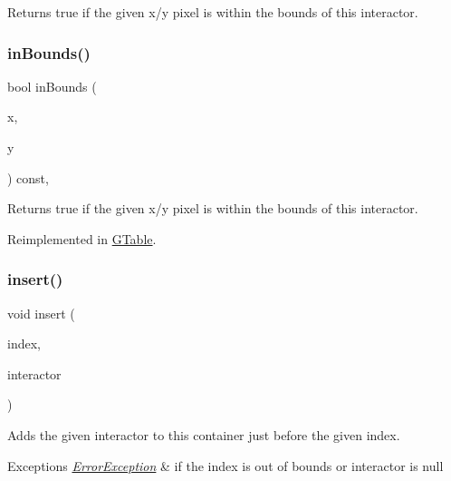 Returns true if the given x/y pixel is within the bounds of this interactor. 

\mbox{\label{classGInteractor_ae6d7982c1c627b677a5e776ca86118ed}} 
\subsubsection{\texorpdfstring{in\+Bounds()}{inBounds()}\hspace{0.1cm}{\footnotesize\ttfamily [2/2]}}
{\footnotesize\ttfamily bool in\+Bounds (\begin{DoxyParamCaption}\item[{int}]{x,  }\item[{int}]{y }\end{DoxyParamCaption}) const\hspace{0.3cm}{\ttfamily [virtual]}, {\ttfamily [inherited]}}



Returns true if the given x/y pixel is within the bounds of this interactor. 



Reimplemented in \mbox{\hyperlink{classGTable_afa6b6241d2f7af75f2d1345f46acfc35}{G\+Table}}.

\mbox{\label{classGContainer_afffb8f789ff9a8466fbae5b846a0ebe7}} 
\subsubsection{\texorpdfstring{insert()}{insert()}\hspace{0.1cm}{\footnotesize\ttfamily [1/2]}}
{\footnotesize\ttfamily void insert (\begin{DoxyParamCaption}\item[{int}]{index,  }\item[{\mbox{\hyperlink{classGInteractor}{G\+Interactor}} $\ast$}]{interactor }\end{DoxyParamCaption})\hspace{0.3cm}{\ttfamily [virtual]}}



Adds the given interactor to this container just before the given index. 


\begin{DoxyExceptions}{Exceptions}
{\em \mbox{\hyperlink{classErrorException}{Error\+Exception}}} & if the index is out of bounds or interactor is null \\
\hline
\end{DoxyExceptions}
\mbox{\label{classGContainer_a2e9d7c6d9e6769d4cfd3293afe7e215c}} 
